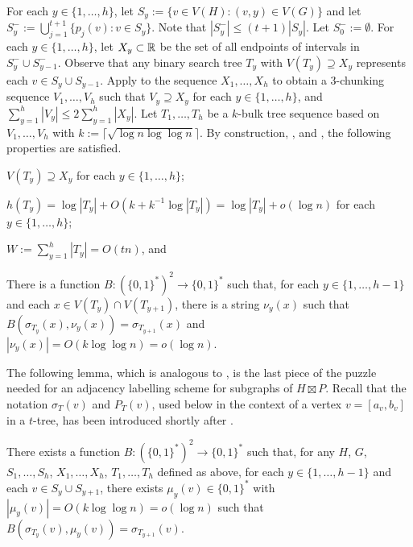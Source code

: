 \documentclass[kpfonts]{patmorin}
\let\le\leqslant
\begin{document}
For each $y\in\{1,\ldots,h\}$, let $S_y:=\{v\in V(H): (v,y)\in V(G)\}$ and let $S^-_y:=\bigcup_{j=1}^{t+1}\{p_j(v):v\in S_y\}$.
Note that $|S^-_y|\le (t+1)|S_y|$.
Let $S^-_0:=\emptyset$.
For each $y\in\{1,\ldots,h\}$, let $X_y\subset\mathbb{R}$ be the set of all endpoints of intervals in $S^-_y\cup S^-_{y-1}$.  Observe that any binary search tree $T_y$ with $V(T_y)\supseteq X_y$ represents each $v\in S_y\cup S_{y-1}$.
Apply  to the sequence $X_1,\ldots,X_h$ to obtain a $3$-chunking sequence $V_1,\ldots,V_{h}$ such that $V_y\supseteq X_y$ for each $y\in\{1,\ldots,h\}$, and $\sum_{y=1}^h |V_y|\le 2\sum_{y=1}^h |X_y|$.
Let $T_1,\ldots,T_h$ be a $k$-bulk tree sequence based on $V_1,\ldots,V_{h}$ with $k:=\lceil \sqrt{\log n \log \log n}\rceil$.
By construction, , and , the following properties are satisfied.
\begin{compactenum}[(PR1)]  %
  \item $V(T_y)\supseteq X_y$ for each $y\in\{1,\ldots,h\}$;
  \item $h(T_y)= \log |T_y| + O(k+k^{-1}\log |T_y|)= \log |T_y| + o(\log n)$ for each $y\in\{1,\ldots,h\}$;
  \item $W:=\sum_{y=1}^h |T_y|= O(tn)$, and
  \item There is a function $B:(\{0,1\}^*)^2\to\{0,1\}^*$ such that, for each $y\in\{1,\ldots,h-1\}$ and each $x\in V(T_y)\cap V(T_{y+1})$, there is a string $\nu_y(x)$ such that $B(\sigma_{T_y}(x),\nu_y(x))=\sigma_{T_{y+1}}(x)$ and $|\nu_y(x)|=O(k\log\log n)=o(\log n)$.
\end{compactenum}

The following lemma, which is analogous to , is the last piece of the puzzle needed for an adjacency labelling scheme for subgraphs of $H\boxtimes P$. Recall that the notation $\sigma_T(v)$ and $P_T(v)$, used below in the context of a vertex $v=[a_v,b_v]$ in a $t$-tree, has been introduced shortly after .

\begin{lem}
  There exists a function $B:(\{0,1\}^*)^2\to \{0,1\}^*$ such that, for any
  $H$, $G$, $S_1,\ldots,S_h$, $X_1,\ldots,X_h$, $T_1,\ldots,T_h$ defined as above, for each $y\in\{1,\ldots,h-1\}$ and each $v\in S_y \cup S_{y+1}$, there exists $\mu_y(v)\in\{0,1\}^*$ with $|\mu_y(v)|= O(k\log\log n)=o(\log n)$ such that $B(\sigma_{T_y}(v), \mu_y(v))=\sigma_{T_{y+1}}(v)$.
\end{lem}
\end{document}
